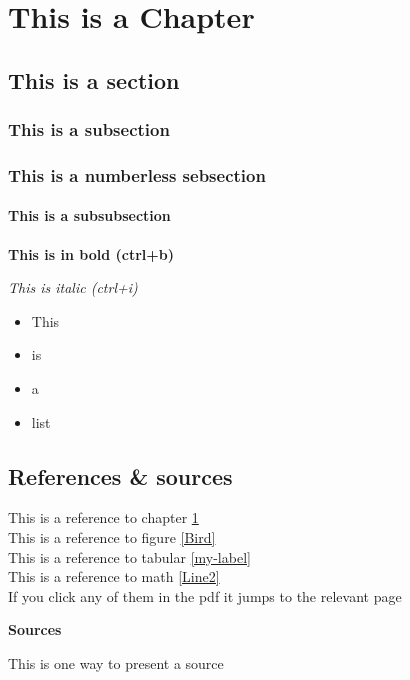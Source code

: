 \chapter{This is a Chapter}\label{Chapter Ref}

\section{This is a section}

\subsection{This is a subsection}

\subsection*{This is a numberless sebsection}%


\subsubsection{This is a subsubsection}



\textbf{This is in bold (ctrl+b)}


\textit{This is italic (ctrl+i)} 

\begin{itemize}
    \item This 
    \item is
    \item a
    \item list
\end{itemize}


\section{References \& sources}
This is a reference to chapter \ref{Chapter Ref} \\
This is a reference to figure \ref{Bird} \\
This is a reference to tabular \ref{my-label}\\
This is a reference to math \ref{Line2} \\

If you click any of them in the pdf it jumps to the relevant page


\textbf{Sources}

This is one way to present a source \citet{isover} 

